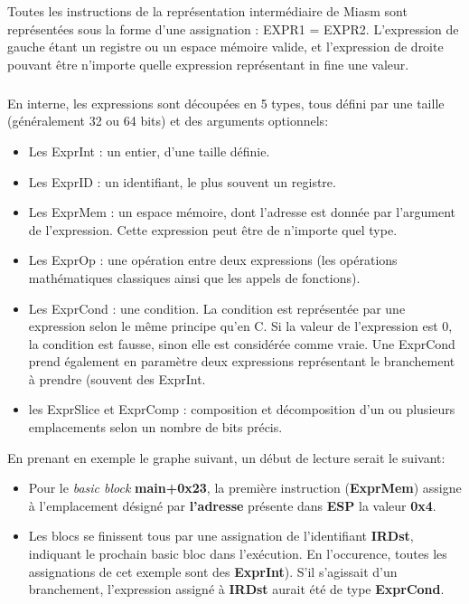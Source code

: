 Toutes les instructions de la représentation intermédiaire de Miasm sont représentées sous la forme d'une assignation : EXPR1 = EXPR2.
L'expression de gauche étant un registre ou un espace mémoire valide, et l'expression de droite pouvant être n'importe quelle expression
représentant in fine une valeur.
\subparagraph{}
En interne, les expressions sont découpées en 5 types, tous défini par une taille (généralement 32 ou 64 bits) et des arguments optionnels:
\begin{itemize}
    \item Les ExprInt : un entier, d'une taille définie.
    \item Les ExprID : un identifiant, le plus souvent un registre.
    \item Les ExprMem : un espace mémoire, dont l'adresse est donnée par l'argument de l'expression. Cette expression peut être de n'importe quel type.
    \item Les ExprOp : une opération entre deux expressions (les opérations mathématiques classiques ainsi que les appels de fonctions).
    \item Les ExprCond : une condition. La condition est représentée par une expression selon le même principe qu'en C. Si la valeur de l'expression est 0, la condition est fausse,
sinon elle est considérée comme vraie. Une ExprCond prend également en paramètre deux expressions représentant le branchement à prendre (souvent des ExprInt.
    \item les ExprSlice et ExprComp : composition et décomposition d'un ou plusieurs emplacements selon un nombre de bits précis.
\end{itemize}
En prenant en exemple le graphe suivant, un début de lecture serait le suivant:
\begin{itemize}
    \item Pour le \textit{basic block} \textbf{main+0x23}, la première instruction (\textbf{ExprMem}) assigne à l'emplacement désigné par \textbf{l'adresse}
        présente dans \textbf{ESP} la valeur \textbf{0x4}.
    \item Les blocs se finissent tous par une assignation de l'identifiant \textbf{IRDst}, indiquant le prochain basic bloc dans l'exécution.
        En l'occurence, toutes les assignations de cet exemple sont des \textbf{ExprInt}). S'il s'agissait d'un branchement, l'expression assigné à \textbf{IRDst}
        aurait été de type \textbf{ExprCond}.
\end{itemize}
